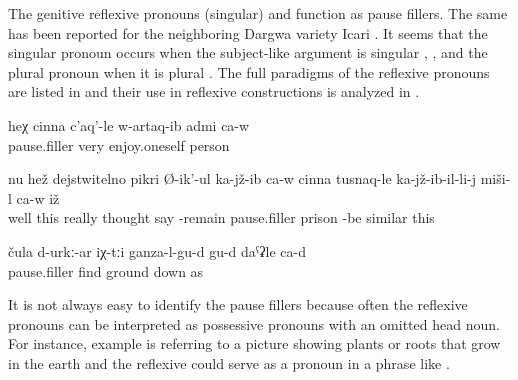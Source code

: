 The genitive reflexive pronouns  (singular) and  function as pause fillers. The same has been reported for the neighboring Dargwa variety Icari \citep[187, fn.~107]{Sumbatova.Mutalov2003}. It seems that the singular pronoun occurs when the subject-like argument is singular , , and the plural pronoun when it is plural . The full paradigms of the reflexive pronouns are listed in  and their use in reflexive constructions is analyzed in .
%
\begin{exe}
	\ex	\label{ex:He is a person that is very extroverted minor@7a}
	\gll	heχ	cinna	c'aq'-le	w-artaq-ib	admi	ca-w\\
			pause.filler	very	enjoy.oneself	person	\\
	\glt	{}

	\ex	\label{ex:‎He is really thinking (or worrying), and sitting, it looks like he is in prison minor}
	\gll	nu	hež	dejstwitelno	pikri	Ø-ik'-ul	ka-jž-ib	ca-w	cinna		tusnaq-le	ka-jž-ib-il-li-j	miši-l	ca-w	iž\\
		well	this	really	thought	say	-remain		pause.filler	prison	-be	similar		this\\
	\glt	{}

	\ex	\label{ex:Well, probably they are like under the ground (growing) minor@7b}
	\gll	čula	d-urkː-ar	iχ-tːi	ganza-l-gu-d	gu-d	daˁʡle	ca-d\\
		pause.filler	find		ground	down	as	\\
	\glt	{}
\end{exe}

It is not always easy to identify the pause fillers because often the reflexive pronouns can be interpreted as possessive pronouns with an omitted head noun. For instance, example  is referring to a picture showing plants or roots that grow in the earth and the reflexive  could serve as a pronoun in a phrase like .

